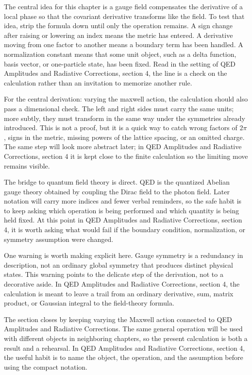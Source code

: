 The central idea for this chapter is a gauge field compensates the derivative of a local phase so that the covariant derivative transforms like the field.  To test that idea, strip the formula down until only the operation remains.  A sign change after raising or lowering an index means the metric has entered.  A derivative moving from one factor to another means a boundary term has been handled.  A normalization constant means that some unit object, such as a delta function, basis vector, or one-particle state, has been fixed.  Read in the setting of QED Amplitudes and Radiative Corrections, section 4, the line is a check on the calculation rather than an invitation to memorize another rule.

For the central derivation: varying the maxwell action, the calculation should also pass a dimensional check.  The left and right sides must carry the same units; more subtly, they must transform in the same way under the symmetries already introduced.  This is not a proof, but it is a quick way to catch wrong factors of \(2\pi\), signs in the metric, missing powers of the lattice spacing, or an omitted charge.  The same step will look more abstract later; in QED Amplitudes and Radiative Corrections, section 4 it is kept close to the finite calculation so the limiting move remains visible.

The bridge to quantum field theory is direct.  QED is the quantized Abelian gauge theory obtained by coupling the Dirac field to the photon field.  Later notation will carry more indices and fewer verbal reminders, so the safe habit is to keep asking which operation is being performed and which quantity is being held fixed.  At this point in QED Amplitudes and Radiative Corrections, section 4, it is worth asking what would fail if the boundary condition, normalization, or symmetry assumption were changed.

One warning is worth making explicit here.  Gauge symmetry is a redundancy in description, not an ordinary global symmetry that produces distinct physical states.  This warning points to the delicate step of the derivation, not to a decorative aside.  In QED Amplitudes and Radiative Corrections, section 4, the calculation is meant to leave a trail from an ordinary derivative, sum, matrix product, or Gaussian integral to the field-theory formula.

The section closes by keeping varying the Maxwell action connected to QED Amplitudes and Radiative Corrections.  The same general operation will be used with different objects in neighboring chapters, so the present calculation is both a result and a rehearsal.  In QED Amplitudes and Radiative Corrections, section 4, the useful habit is to name the object, the operation, and the assumption before using the compact notation.



